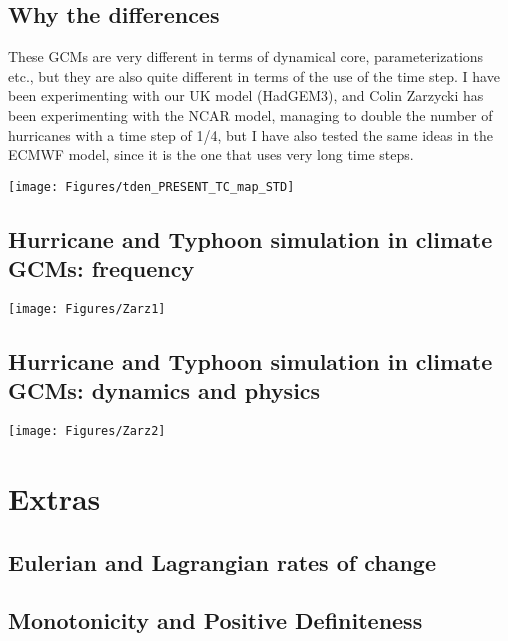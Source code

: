 \subsection{Why the differences}

	These GCMs are very different in terms of dynamical core, parameterizations etc., but they are also quite different in terms of the use of the time step. I have been experimenting with our UK model (HadGEM3), and Colin Zarzycki has been experimenting with the NCAR model, managing to double the number of hurricanes with a time step of 1/4, but I have also tested the same ideas in the ECMWF model, since it is the one that uses very long time steps.
	\begin{center}	
		\texttt{[image: Figures/tden\_PRESENT\_TC\_map\_STD]}
	\end{center}
	


\subsection{Hurricane and Typhoon simulation in climate GCMs: frequency}

	\begin{center}	
		\texttt{[image: Figures/Zarz1]}
	\end{center}
	


\subsection{Hurricane and Typhoon simulation in climate GCMs: dynamics and physics}
	
	\begin{center}	
		\texttt{[image: Figures/Zarz2]}
	\end{center}
	

\section{Extras}

\subsection{Eulerian and Lagrangian rates of change}
\subsection{Monotonicity and Positive Definiteness}

